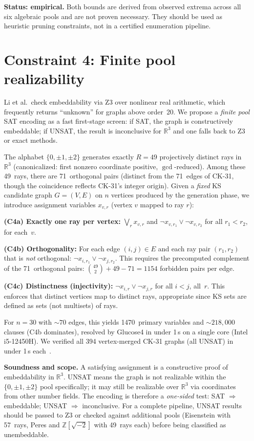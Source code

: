 \documentclass[twocolumn,prl,superscriptaddress,nofootinbib]{revtex4-2}
\newcommand{\R}{\mathbb{R}}
\newcommand{\Z}{\mathbb{Z}}
\begin{document}
\textbf{Status: empirical.}  Both bounds are derived from observed extrema across all six algebraic pools and are not proven necessary.  They should be used as heuristic pruning constraints, not in a certified enumeration pipeline.

\section{Constraint 4: Finite pool realizability}

Li et al.\ check embeddability via Z3 over nonlinear real arithmetic, which frequently returns ``unknown'' for graphs above order~20.  We propose a \emph{finite pool} SAT encoding as a fast first-stage screen: if SAT, the graph is constructively embeddable; if UNSAT, the result is inconclusive for $\R^3$ and one falls back to Z3 or exact methods.

The alphabet $\{0, \pm1, \pm2\}$ generates exactly $R = 49$ projectively distinct rays in $\R^3$ (canonicalized: first nonzero coordinate positive, $\gcd$-reduced).  Among these 49~rays, there are 71~orthogonal pairs (distinct from the 71~edges of CK-31, though the coincidence reflects CK-31's integer origin).  Given a \emph{fixed} KS candidate graph $G = (V, E)$ on $n$ vertices produced by the generation phase, we introduce assignment variables $x_{v,r}$ (vertex $v$ mapped to ray $r$):

\noindent\textbf{(C4a) Exactly one ray per vertex:}
$\bigvee_{r} x_{v,r}$ and $\neg x_{v,r_1} \vee \neg x_{v,r_2}$ for all $r_1 < r_2$, for each~$v$.

\noindent\textbf{(C4b) Orthogonality:} For each edge $(i,j) \in E$ and each ray pair $(r_1, r_2)$ that is \emph{not} orthogonal:
$\neg x_{i,r_1} \vee \neg x_{j,r_2}$.
This requires the precomputed complement of the 71~orthogonal pairs: $\binom{49}{2} + 49 - 71 = 1154$ forbidden pairs per edge.

\noindent\textbf{(C4c) Distinctness (injectivity):}
$\neg x_{i,r} \vee \neg x_{j,r}$ for all $i < j$, all~$r$.
This enforces that distinct vertices map to distinct rays, appropriate since KS sets are defined as sets (not multisets) of rays.

For $n = 30$ with ${\sim}70$ edges, this yields 1470~primary variables and ${\sim}218{,}000$ clauses (C4b dominates), resolved by Glucose4 in under 1\,s on a single core (Intel i5-12450H).  We verified all 394 vertex-merged CK-31 graphs (all UNSAT) in under 1\,s each~\cite{Kernaghan2026sub31}.

\textbf{Soundness and scope.}  A satisfying assignment is a constructive proof of embeddability in $\R^3$.  UNSAT means the graph is not realizable within the $\{0,\pm1,\pm2\}$ pool specifically; it may still be realizable over $\R^3$ via coordinates from other number fields.  The encoding is therefore a \emph{one-sided} test: SAT $\Rightarrow$ embeddable; UNSAT $\Rightarrow$ inconclusive.  For a complete pipeline, UNSAT results should be passed to Z3 or checked against additional pools (Eisenstein with 57~rays, Peres and $\Z[\sqrt{-2}]$ with 49~rays each) before being classified as unembeddable.
\end{document}
